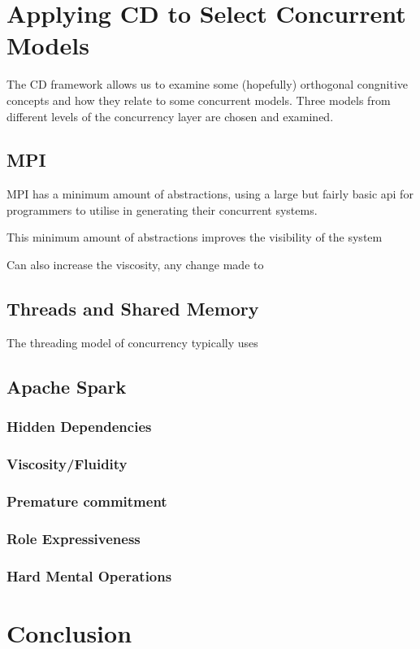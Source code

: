 \documentclass{sig-alternate}
\begin{document}
\section{Applying CD to Select Concurrent Models}
The CD framework allows us to examine some (hopefully) orthogonal congnitive concepts and how they relate to some concurrent models. Three models from different levels of the concurrency layer are chosen and examined.

\subsection{MPI}
MPI has a minimum amount of abstractions, using a large but fairly basic api for programmers to utilise in generating their concurrent systems.

This minimum amount of abstractions improves the visibility of the system

Can also increase the viscosity, any change made to 

\subsection{Threads and Shared Memory}
The threading model of concurrency typically uses 


\subsection{Apache Spark}
\subsubsection{Hidden Dependencies}

\subsubsection{Viscosity/Fluidity}

\subsubsection{Premature commitment}

\subsubsection{Role Expressiveness}

\subsubsection{Hard Mental Operations}

\section{Conclusion}





\end{document}
